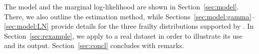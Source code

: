 The model and the marginal log-likelihood are shown in Section~\ref{sec:model}.
There, we also outline the estimation method,
  while Sections~\ref{sec:model:gamma}--\ref{sec:model:LN} provide details 
  for the three frailty distributions supported by .
In Section~\ref{sec:rexample}, we apply  to a real dataset in order to illustrate its use and its output.
Section~\ref{sec:concl} concludes with remarks.
